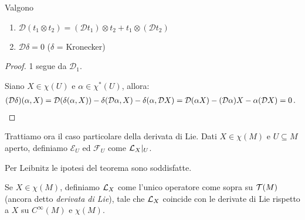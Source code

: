 \begin{corollary}
	Valgono
	\begin{enumerate}
		\item $\mathcal D(t_1\otimes t_2) = (\mathcal D t_1) \otimes t_2 + t_1\otimes (\mathcal D t_2)$
		\item $\mathcal D\delta = 0$ ($\delta$ = Kronecker)
	\end{enumerate}
\end{corollary}
\begin{proof}
	1 segue da $\mathcal D_1$.
	
	Siano $X\in\chi(U)$ e $\alpha\in\chi^*(U)$, allora: 
	\begin{align*}
	(\mathcal D\delta)(\alpha, X) = \mathcal D(\delta(\alpha,X)) - \delta(\mathcal D\alpha,X) - \delta(\alpha,\mathcal D X) = \mathcal D (\alpha X) - (\mathcal D\alpha)X - \alpha(\mathcal DX) = 0\punto %
	\end{align*}
\end{proof}

Trattiamo ora il caso particolare della derivata di Lie.
Dati $X\in\chi(M)$ e $U\subseteq M$ aperto, definiamo $\mathcal E_U$ ed $\mathcal F_U$ come $\mathcal L_X|_ U$.

Per Leibnitz le ipotesi del teorema sono soddisfatte.

\begin{definition}
	Se $X\in\chi(M)$, definiamo $\mathcal L_X$ come l'unico operatore come sopra su $\mathcal T(M)$ (ancora detto \emph{derivata di Lie}), tale che $\mathcal L_X$ coincide con le derivate di Lie rispetto a $X$ su $C^\infty(M)$ e $\chi(M)$.
\end{definition}

